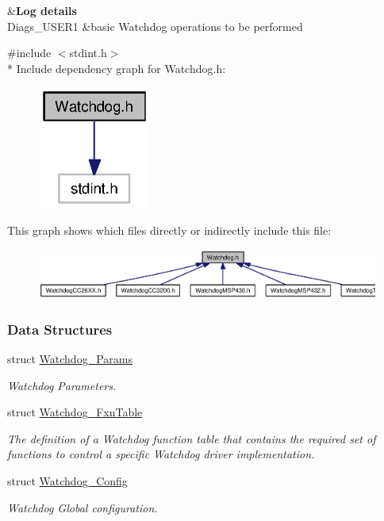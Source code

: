 \begin{TabularC}{2}
\hline
{}&{\bf Log details  }\\
Diags\+\_\+\+U\+S\+E\+R1 &basic Watchdog operations to be performed \\
\end{TabularC}


{\ttfamily \#include $<$stdint.\+h$>$}\\*
Include dependency graph for Watchdog.\+h\+:
\nopagebreak
\begin{figure}[H]
\begin{center}
\leavevmode
\includegraphics[width=105pt]{_watchdog_8h__incl}
\end{center}
\end{figure}
This graph shows which files directly or indirectly include this file\+:
\nopagebreak
\begin{figure}[H]
\begin{center}
\leavevmode
\includegraphics[width=350pt]{_watchdog_8h__dep__incl}
\end{center}
\end{figure}
\subsubsection*{Data Structures}
\begin{DoxyCompactItemize}
\item 
struct \hyperlink{struct_watchdog___params}{Watchdog\+\_\+\+Params}
\begin{DoxyCompactList}\small\item\em Watchdog Parameters. \end{DoxyCompactList}\item 
struct \hyperlink{struct_watchdog___fxn_table}{Watchdog\+\_\+\+Fxn\+Table}
\begin{DoxyCompactList}\small\item\em The definition of a Watchdog function table that contains the required set of functions to control a specific Watchdog driver implementation. \end{DoxyCompactList}\item 
struct \hyperlink{struct_watchdog___config}{Watchdog\+\_\+\+Config}
\begin{DoxyCompactList}\small\item\em Watchdog Global configuration. \end{DoxyCompactList}\end{DoxyCompactItemize}
